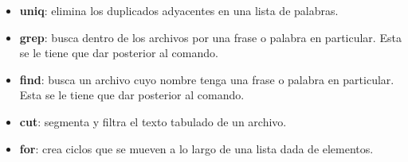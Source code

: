 \documentclass[10pt,letterpaper]{article}
\begin{document}
\begin{small}
\begin{itemize}
\item \textbf{uniq}: elimina los duplicados adyacentes en una lista de palabras.
\item \textbf{grep}: busca dentro de los archivos por una frase o palabra en particular. Esta se le tiene que dar posterior al comando.
\item \textbf{find}: busca un archivo cuyo nombre tenga una frase o palabra en particular. Esta se le tiene que dar posterior al comando.
\item \textbf{cut}: segmenta y filtra el texto tabulado de un archivo.
\item \textbf{for}: crea ciclos que se mueven a lo largo de una lista dada de elementos.
\end{itemize}
\end{small}
\end{document}
